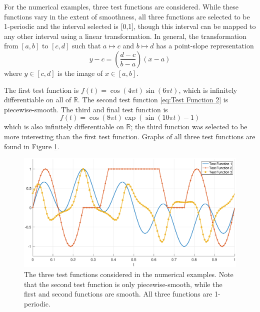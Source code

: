 \documentclass[12pt]{book}
\begin{document}
For the numerical examples, three test functions are considered. While these functions vary in the extent of smoothness, all three functions are selected to be 1-periodic and the interval selected is [0,1], though this interval can be mapped to any other interval using a linear transformation. In general, the transformation from $[a,b]$ to $[c,d]$ such that $a \mapsto c$ and $b \mapsto d$ has a point-slope representation
\[y - c = \left(\frac{d-c}{b-a}\right)(x - a)\]
where $y \in [c,d]$ is the image of $x \in [a,b]$. \par
The first test function is $f(t) = \cos(4\pi{t})\sin(6\pi{t})$, which is infinitely differentiable on all of $\mathbb{R}$. The second test function \eqref{eq:Test Function 2} is piecewise-smooth. The third and final test function is
\begin{equation}
f(t) = \cos(8\pi{t})\exp(\sin(10\pi{t})-1)
\label{eq:Test Function 3}
\end{equation}
which is also infinitely differentiable on $\mathbb{R}$; the third function was selected to be more interesting than the first test function. Graphs of all three test functions are found in Figure \ref{TestFunctions}.  \par

\begin{figure}
	\centerline{\includegraphics[scale = 0.45]{Figures/TestFunctions1D.eps}}
\caption{The three test functions considered in the numerical examples. Note that the second test function is only piecewise-smooth, while the first and second functions are smooth. All three functions are 1-periodic.}
\label{TestFunctions}
\end{figure}
\end{document}
